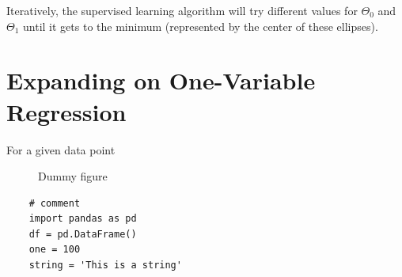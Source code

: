 \documentclass[twoside, 11pt-]{article}
\begin{document}
\pagebreak

Iteratively, the supervised learning algorithm will try different values for $\Theta_0$ and $\Theta_1$ until it gets to the minimum (represented by the center of these ellipses).



\section{Expanding on One-Variable Regression}
	
For a given data point 
	
	\begin{figure}
		\caption{Dummy figure}
	\end{figure}

	
	\begin{lstlisting}
	# comment
	import pandas as pd
	df = pd.DataFrame()
	one = 100
	string = 'This is a string'
	\end{lstlisting}





\newpage \begin{appendix} \listoffigures \listoftables \end{appendix}
\end{document}
